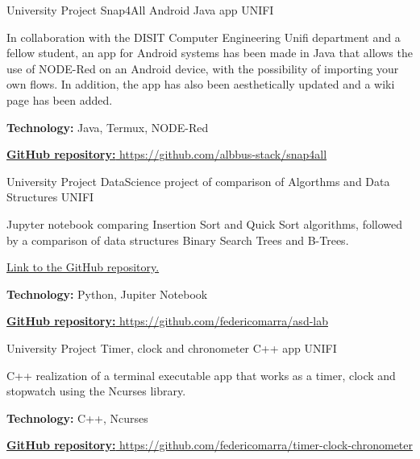 \begin{cventries}
  \cventry
    {University Project} %
    {Snap4All Android Java app} %
    {UNIFI} %
    {} %
    {
      \begin{cvitems} %
        \item {In collaboration with the DISIT Computer Engineering Unifi department and a fellow student, an app for Android systems has been made in Java that allows the use of NODE-Red on an Android device, with the possibility of importing your own flows. In addition, the app has also been aesthetically updated and a wiki page has been added.}
        \item {\textbf{Technology:} Java, Termux, NODE-Red}
        \item {\href{https://github.com/albbus-stack/snap4all}{\textbf{GitHub repository:} https://github.com/albbus-stack/snap4all}}
      \end{cvitems}
    }

  \cventry
    {University Project} %
    {DataScience project of comparison of Algorthms and Data Structures} %
    {UNIFI} %
    {} %
    {
      \begin{cvitems} %
        \item {Jupyter notebook comparing Insertion Sort and Quick Sort algorithms, followed by a comparison of data structures Binary Search Trees and B-Trees.}
        \item {\href{https://github.com/federicomarra/asd-lab}{Link to the GitHub repository.}}
        \item {\textbf{Technology:} Python, Jupiter Notebook}
        \item {\href{https://github.com/federicomarra/asd-lab}{\textbf{GitHub repository:} https://github.com/federicomarra/asd-lab}}
      \end{cvitems}
    }

  \cventry
    {University Project} %
    {Timer, clock and chronometer C++ app} %
    {UNIFI} %
    {} %
    {
      \begin{cvitems} %
        \item {C++ realization of a terminal executable app that works as a timer, clock and stopwatch using the Ncurses library.}
        \item {\textbf{Technology:} C++, Ncurses}
        \item {\href{https://github.com/federicomarra/timer-clock-chronometer}{\textbf{GitHub repository:} https://github.com/federicomarra/timer-clock-chronometer}}
      \end{cvitems}
    }


\end{cventries}
